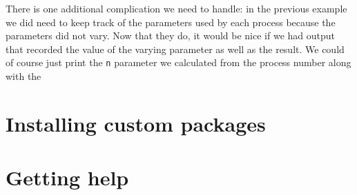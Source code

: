 \documentclass[11pt]{article}
\begin{document}
There is one additional complication we need to handle: in the previous example we did need to keep track of the parameters used by each process because the parameters did not vary. Now that they do, it would be nice if we had output that recorded the value of the varying parameter as well as the result. We could of course just print the \texttt{n} parameter we calculated from the process number along with the 
\section{Installing custom packages}
\label{sec-8}

\section{Getting help}
\label{sec-9}
\end{document}
